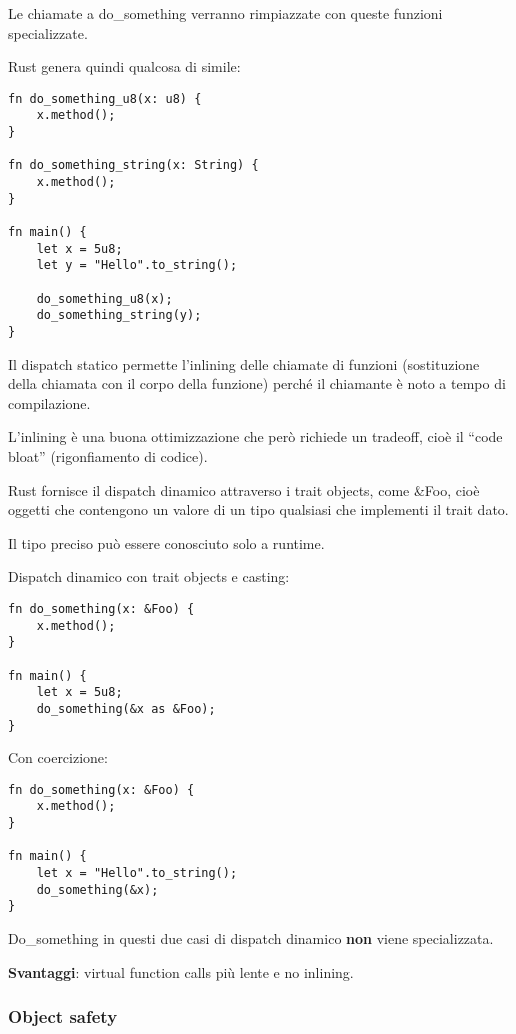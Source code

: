 Le chiamate a do\_something verranno rimpiazzate con queste funzioni
specializzate.

Rust genera quindi qualcosa di simile:

\begin{lstlisting}
fn do_something_u8(x: u8) {
    x.method();
}

fn do_something_string(x: String) {
    x.method();
}

fn main() {
    let x = 5u8;
    let y = "Hello".to_string();

    do_something_u8(x);
    do_something_string(y);
}
\end{lstlisting}

Il dispatch statico permette l'inlining delle chiamate di funzioni (sostituzione
della chiamata con il corpo della funzione) perché il chiamante è noto a tempo
di compilazione.

L'inlining è una buona ottimizzazione che però richiede un tradeoff, cioè il
``code bloat'' (rigonfiamento di codice).

Rust fornisce il dispatch dinamico attraverso i trait objects, come \&Foo, cioè
oggetti che contengono un valore di un tipo qualsiasi che implementi il trait
dato.

Il tipo preciso può essere conosciuto solo a runtime.

Dispatch dinamico con trait objects e casting:

\begin{lstlisting}
fn do_something(x: &Foo) {
    x.method();
}

fn main() {
    let x = 5u8;
    do_something(&x as &Foo);
}
\end{lstlisting}

Con coercizione:

\begin{lstlisting}
fn do_something(x: &Foo) {
    x.method();
}

fn main() {
    let x = "Hello".to_string();
    do_something(&x);
}
\end{lstlisting}

Do\_something in questi due casi di dispatch dinamico \textbf{non} viene
specializzata.

\textbf{Svantaggi}: virtual function calls più lente e no inlining.

\subsubsection{Object safety}

